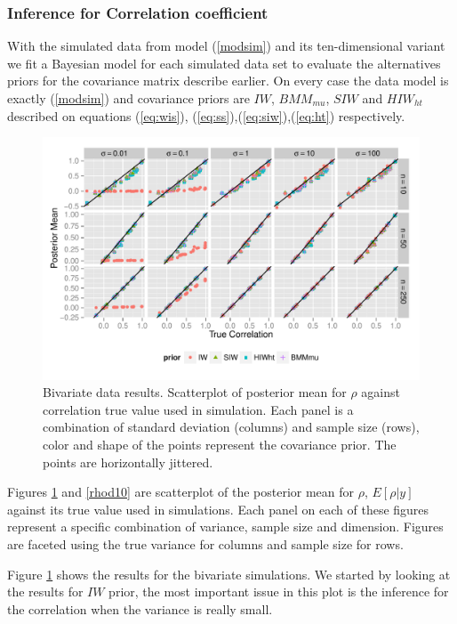 \documentclass{article}
\begin{document}
%
%

\subsubsection{Inference for Correlation coefficient}

With the simulated data from model (\ref{modsim}) and its ten-dimensional variant we fit a Bayesian model for each simulated data set to evaluate the alternatives priors for the covariance matrix describe earlier.  On every case the data model is exactly (\ref{modsim}) and covariance priors are $IW$, $BMM_{mu}$, $SIW$ and $HIW_{ht}$ described on equations (\ref{eq:wis}), (\ref{eq:ss}),(\ref{eq:siw}),(\ref{eq:ht}) respectively.   
\begin{figure}[hbtp]
   \centering
   \includegraphics[width=\textwidth] {fig_rho_d2} 
    \vspace{-.5in}
   \caption{Bivariate data results. Scatterplot of posterior mean for $\rho$  against correlation true value used in simulation. Each panel is a combination of standard deviation (columns) and sample size (rows),  color and shape of the points represent the covariance prior. The points are horizontally jittered. \label{rhod2}}
\end{figure}

Figures \ref{rhod2} and \ref{rhod10} are scatterplot of the posterior mean for $\rho$, $E[\rho\vert y]$ against its true value used in simulations.  Each panel on each of these figures represent a specific combination of variance, sample size and dimension.  Figures are faceted using the true variance for columns and sample size for rows. 

Figure \ref{rhod2} shows the results for the bivariate simulations.  We started by looking at the results for $IW$ prior, the most important issue in this plot is the inference for the correlation when the variance is really small. 
\end{document}
